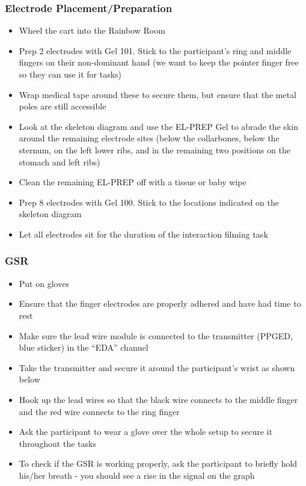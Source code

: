 \documentclass[]{book}
\providecommand{\tightlist}{%
  \setlength{\itemsep}{0pt}\setlength{\parskip}{0pt}}
\begin{document}
\hypertarget{electrode-placementpreparation}{%
\subsubsection{Electrode Placement/Preparation}\label{electrode-placementpreparation}}

\begin{itemize}
\tightlist
\item
  Wheel the cart into the Rainbow Room
\item
  Prep 2 electrodes with Gel 101. Stick to the participant's ring and middle fingers on their non-dominant hand (we want to keep the pointer finger free so they can use it for tasks)
\item
  Wrap medical tape around these to secure them, but ensure that the metal poles are still accessible
\item
  Look at the skeleton diagram and use the EL-PREP Gel to abrade the skin around the remaining electrode sites (below the collarbones, below the sternum, on the left lower ribs, and in the remaining two positions on the stomach and left ribs)
\item
  Clean the remaining EL-PREP off with a tissue or baby wipe
\item
  Prep 8 electrodes with Gel 100. Stick to the locations indicated on the skeleton diagram
\item
  Let all electrodes sit for the duration of the interaction filming task
\end{itemize}

\hypertarget{gsr}{%
\subsubsection{GSR}\label{gsr}}

\begin{itemize}
\tightlist
\item
  Put on gloves
\item
  Ensure that the finger electrodes are properly adhered and have had time to rest
\item
  Make sure the lead wire module is connected to the transmitter (PPGED, blue sticker) in the ``EDA'' channel
\item
  Take the transmitter and secure it around the participant's wrist as shown below
\item
  Hook up the lead wires so that the black wire connects to the middle finger and the red wire connects to the ring finger
\item
  Ask the participant to wear a glove over the whole setup to secure it throughout the tasks
\item
  To check if the GSR is working properly, ask the participant to briefly hold his/her breath - you should see a rise in the signal on the graph
\end{itemize}
\end{document}
